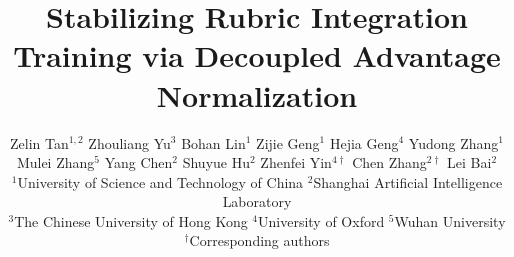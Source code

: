 \documentclass[11pt]{article}
\title{Stabilizing Rubric Integration Training via Decoupled
Advantage Normalization}
\author{
  \mdseries
  Zelin Tan$^{1,2}$ \quad
  Zhouliang Yu$^{3}$ \quad
  Bohan Lin$^{1}$ \quad
  Zijie Geng$^{1}$ \quad
  Hejia Geng$^{4}$ \quad
  Yudong Zhang$^{1}$ \\
  Mulei Zhang$^{5}$ \quad
  Yang Chen$^{2}$ \quad
  Shuyue Hu$^{2}$ \quad
  Zhenfei Yin$^{4\dagger}$ \quad
  Chen Zhang$^{2\dagger}$ \quad
  Lei Bai$^{2}$ \\[6pt]
  $^{1}$University of Science and Technology of China \quad
  $^{2}$Shanghai Artificial Intelligence Laboratory \\
  $^{3}$The Chinese University of Hong Kong \quad
  $^{4}$University of Oxford \quad
  $^{5}$Wuhan University \\[4pt]
  {\small $^{\dagger}$Corresponding authors}
}
\begin{document}
\maketitle

\begin{abstract}

\end{abstract}









\newpage





\appendix

\end{document}
